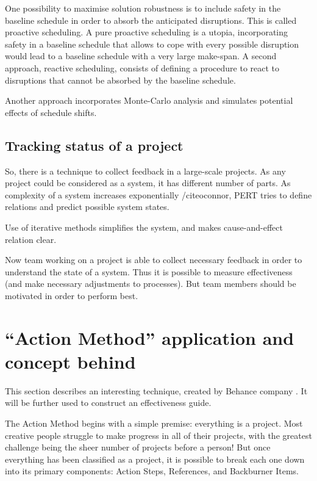 One possibility to maximise solution robustness is to include safety in the baseline schedule in order to absorb the anticipated disruptions. This is called proactive scheduling. A pure proactive scheduling is a utopia, incorporating safety in a baseline schedule that allows to cope with every possible disruption would lead to a baseline schedule with a very large make-span. A second approach, reactive scheduling, consists of defining a procedure to react to disruptions that cannot be absorbed by the baseline schedule.

Another approach incorporates Monte-Carlo analysis and simulates potential effects of schedule shifts.

\subsection{Tracking status of a project}

So, there is a technique to collect feedback in a large-scale projects. As any project could be considered as a system, it has different number of parts. As complexity of a system increases exponentially /cite{oconnor}, PERT tries to define relations and predict possible system states.

Use of iterative methods simplifies the system, and makes cause-and-effect relation clear.

Now team working on a project is able to collect necessary feedback in order to understand the state of a system. Thus it is possible to measure effectiveness (and make necessary adjustments to processes). But team members should be motivated in order to perform best.

\section{``Action Method'' application and concept behind}

This section describes an interesting technique, created by Behance company \cite{belsky}. It will be further used to construct an effectiveness guide.

The Action Method begins with a simple premise: everything is a project. Most creative people struggle to make progress in all of their projects, with the greatest challenge being the sheer number of projects before a person! But once everything has been classified as a project, it is possible to break each one down into its primary components: Action Steps, References, and Backburner Items.


